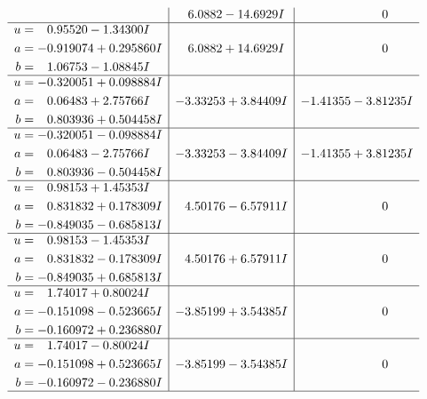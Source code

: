 \documentclass[1p]{elsarticle_modified}
\theoremstyle{definition}
\begin{document}
$$\begin{array}{c|c|c}
 & \phantom{-}6.0882 - 14.6929 I & \phantom{-0.000000 } 0 \\ \hline\begin{aligned}
u &= \phantom{-}0.95520 - 1.34300 I \\
a &= -0.919074 + 0.295860 I \\
b &= \phantom{-}1.06753 - 1.08845 I\end{aligned}
 & \phantom{-}6.0882 + 14.6929 I & \phantom{-0.000000 } 0 \\ \hline\begin{aligned}
u &= -0.320051 + 0.098884 I \\
a &= \phantom{-}0.06483 + 2.75766 I \\
b &= \phantom{-}0.803936 + 0.504458 I\end{aligned}
 & -3.33253 + 3.84409 I & -1.41355 - 3.81235 I \\ \hline\begin{aligned}
u &= -0.320051 - 0.098884 I \\
a &= \phantom{-}0.06483 - 2.75766 I \\
b &= \phantom{-}0.803936 - 0.504458 I\end{aligned}
 & -3.33253 - 3.84409 I & -1.41355 + 3.81235 I \\ \hline\begin{aligned}
u &= \phantom{-}0.98153 + 1.45353 I \\
a &= \phantom{-}0.831832 + 0.178309 I \\
b &= -0.849035 - 0.685813 I\end{aligned}
 & \phantom{-}4.50176 - 6.57911 I & \phantom{-0.000000 } 0 \\ \hline\begin{aligned}
u &= \phantom{-}0.98153 - 1.45353 I \\
a &= \phantom{-}0.831832 - 0.178309 I \\
b &= -0.849035 + 0.685813 I\end{aligned}
 & \phantom{-}4.50176 + 6.57911 I & \phantom{-0.000000 } 0 \\ \hline\begin{aligned}
u &= \phantom{-}1.74017 + 0.80024 I \\
a &= -0.151098 - 0.523665 I \\
b &= -0.160972 + 0.236880 I\end{aligned}
 & -3.85199 + 3.54385 I & \phantom{-0.000000 } 0 \\ \hline\begin{aligned}
u &= \phantom{-}1.74017 - 0.80024 I \\
a &= -0.151098 + 0.523665 I \\
b &= -0.160972 - 0.236880 I\end{aligned}
 & -3.85199 - 3.54385 I & \phantom{-0.000000 } 0\\
 \hline 
 \end{array}$$\newpage\newpage\renewcommand{\arraystretch}{1}
\end{document}
